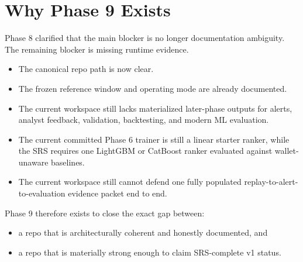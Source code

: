 \documentclass{article}
\begin{document}
\section*{Why Phase 9 Exists}
Phase 8 clarified that the main blocker is no longer documentation ambiguity. The remaining blocker is missing runtime evidence.
\begin{itemize}
\item The canonical repo path is now clear.
\item The frozen reference window and operating mode are already documented.
\item The current workspace still lacks materialized later-phase outputs for alerts, analyst feedback, validation, backtesting, and modern ML evaluation.
\item The current committed Phase 6 trainer is still a linear starter ranker, while the SRS requires one LightGBM or CatBoost ranker evaluated against wallet-unaware baselines.
\item The current workspace still cannot defend one fully populated replay-to-alert-to-evaluation evidence packet end to end.
\end{itemize}

Phase 9 therefore exists to close the exact gap between:
\begin{itemize}
\item a repo that is architecturally coherent and honestly documented, and
\item a repo that is materially strong enough to claim SRS-complete v1 status.
\end{itemize}
\end{document}
